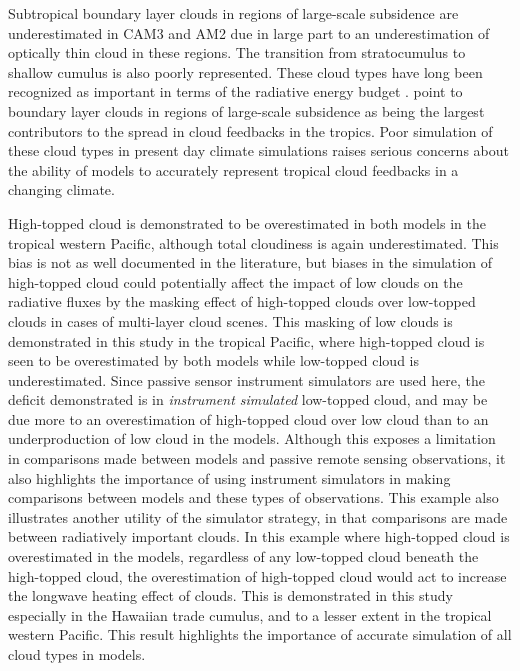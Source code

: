 Subtropical boundary layer clouds in regions of large-scale subsidence are underestimated in CAM3 and AM2 due in large part to an underestimation of optically thin cloud in these regions. The transition from stratocumulus to shallow cumulus is also poorly represented. These cloud types have long been recognized as important in terms of the radiative energy budget \citep{randall_et_al_1984}. \cite{bony_and_dufresne_2005} point to boundary layer clouds in regions of large-scale subsidence as being the largest contributors to the spread in cloud feedbacks in the tropics. Poor simulation of these cloud types in present day climate simulations raises serious concerns about the ability of models to accurately represent tropical cloud feedbacks in a changing climate.

High-topped cloud is demonstrated to be overestimated in both models in the tropical western Pacific, although total cloudiness is again underestimated. This bias is not as well documented in the literature, but biases in the simulation of high-topped cloud could potentially affect the impact of low clouds on the radiative fluxes by the masking effect of high-topped clouds over low-topped clouds in cases of multi-layer cloud scenes. This masking of low clouds is demonstrated in this study in the tropical Pacific, where high-topped cloud is seen to be overestimated by both models while low-topped cloud is underestimated. Since passive sensor instrument simulators are used here, the deficit demonstrated is in \emph{instrument simulated} low-topped cloud, and may be due more to an overestimation of high-topped cloud over low cloud than to an underproduction of low cloud in the models. Although this exposes a limitation in comparisons made between models and passive remote sensing observations, it also highlights the importance of using instrument simulators in making comparisons between models and these types of observations. This example also illustrates another utility of the simulator strategy, in that comparisons are made between radiatively important clouds. In this example where high-topped cloud is overestimated in the models, regardless of any low-topped cloud beneath the high-topped cloud, the overestimation of high-topped cloud would act to increase the longwave heating effect of clouds. This is demonstrated in this study especially in the Hawaiian trade cumulus, and to a lesser extent in the tropical western Pacific. This result highlights the importance of accurate simulation of all cloud types in models.
